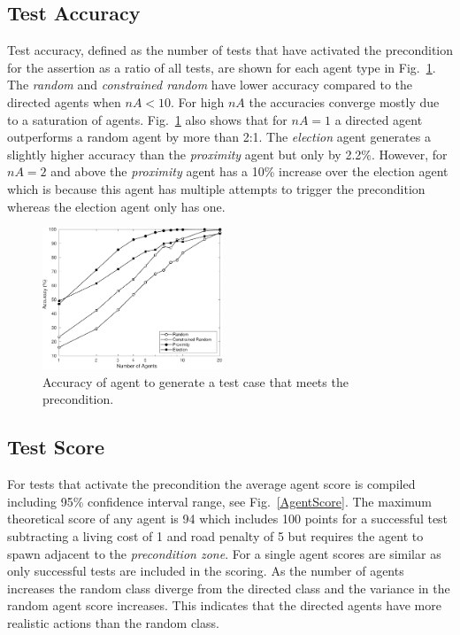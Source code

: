 \documentclass[letterpaper, 10 pt, journal, twoside]{IEEEtran}
\begin{document}
\subsection{Test Accuracy}
Test accuracy, defined as the number of tests that have activated the precondition for the assertion as a ratio of all tests, are shown for each agent type in Fig.~\ref{Accuracy}. The \textit{random} and \textit{constrained random} have lower accuracy compared to the directed agents when $nA<10$. For high $nA$ the accuracies converge mostly due to a saturation of agents.
%
Fig.~\ref{Accuracy} also shows that for $nA=1$ a directed agent outperforms a random agent by more than 2:1. The \textit{election} agent generates a slightly higher accuracy than the \textit{proximity} agent but only by 2.2\%. However, for $nA=2$ and above the \textit{proximity} agent has a 10\% increase over the election agent which is because this agent has multiple attempts to trigger the precondition whereas the election agent only has one.


\begin{figure}[!t]
	\centering
\includegraphics[width=0.48\textwidth]{Accuracy.pdf}
	\caption{Accuracy of agent to generate a test case that meets the precondition.}
	\label{Accuracy}
\end{figure}



\subsection{Test Score} \label{testscore}
For tests that activate the precondition the average agent score is compiled including 95\% confidence interval range, see Fig.~\ref{AgentScore}. The maximum theoretical score of any agent is 94 which includes 100 points for a successful test subtracting a living cost of 1 and road penalty of 5 but requires the agent to spawn adjacent to the \textit{precondition zone}. For a single agent scores are similar as only successful tests are included in the scoring. As the number of agents increases the random class diverge from the directed class and the variance in the random agent score increases. This indicates that the directed agents have more realistic actions than the random class. 
\end{document}
